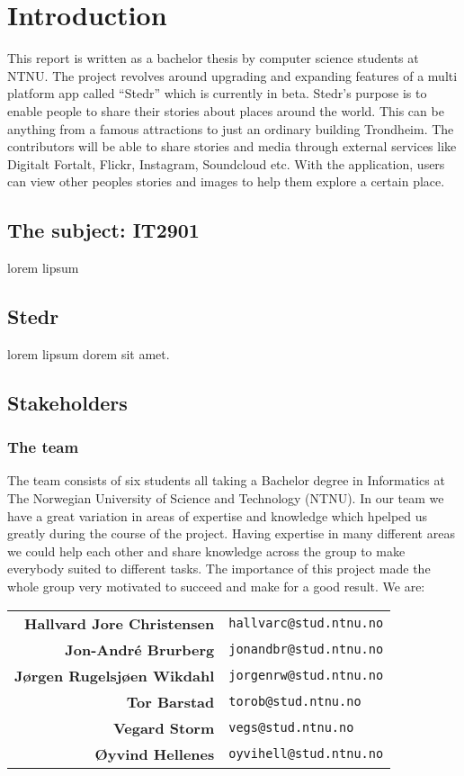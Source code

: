 \section{Introduction}
	\setcounter{page}{1}


This report is written as a bachelor thesis by computer science students at NTNU. The project revolves around upgrading and expanding features of a multi platform app called “Stedr” which is currently in beta. Stedr's purpose is to enable people to share their stories about places around the world. This can be anything from a famous attractions to just an ordinary building Trondheim. The contributors will be able to share stories and media through external services like Digitalt Fortalt, Flickr, Instagram, Soundcloud etc. With the application, users can view other peoples stories and images  to help them explore a certain place.

\subsection{The subject: IT2901}
lorem lipsum

\subsection{Stedr}
lorem lipsum dorem sit amet.

\subsection{Stakeholders}

\subsubsection{The team}
The team consists of six students all taking a Bachelor degree in Informatics at The Norwegian University of Science and Technology (NTNU). In our team we have a great variation in areas of expertise and knowledge which hpelped us greatly during the course of the project. Having expertise in many different areas we could help each other and share knowledge across the group to make everybody suited to different tasks. The importance of this project made the whole group very motivated to succeed and make for a good result.
We are:\\

\begin{tabular}{r|p{11cm}}
\textbf{Hallvard Jore Christensen} & \texttt{hallvarc@stud.ntnu.no}\\
\textbf{Jon-André Brurberg} & \texttt{jonandbr@stud.ntnu.no}\\
\textbf{Jørgen Rugelsjøen Wikdahl} & \texttt{jorgenrw@stud.ntnu.no}\\
\textbf{Tor Barstad} & \texttt{torob@stud.ntnu.no}\\
\textbf{Vegard Storm} & \texttt{vegs@stud.ntnu.no}\\
\textbf{Øyvind Hellenes} & \texttt{oyvihell@stud.ntnu.no}\\
\end{tabular}

